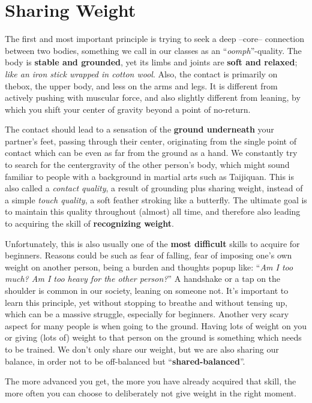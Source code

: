 \section{Sharing Weight}\label{sec:sharing-weight}

The first and most important principle is trying to seek a deep --core-- connection between two bodies, something we call in our classes as an ``\textit{oomph}''-quality.
The body is \textbf{stable and grounded}, yet its limbs and joints are \textbf{soft and relaxed}; \textit{like an iron stick wrapped in cotton wool}.
Also, the contact is primarily on \gls{thebox}, the upper body, and less on the arms and legs.
It is different from actively pushing with muscular force, and also slightly different from leaning, by which you shift your center of gravity beyond a point of no-return.

The contact should lead to a sensation of the \textbf{ground underneath} your partner's feet, passing through their center, originating from the single point of contact which can be even as far from the ground as a hand.
We constantly try to search for the \gls{centergravity} of the other person's body, which might sound familiar to people with a background in martial arts such as Taijiquan.
This is also called a \textit{contact quality}, a result of grounding plus sharing weight, instead of a simple \textit{touch quality}, a soft feather stroking like a butterfly.
The ultimate goal is to maintain this quality throughout (almost) all time, and therefore also leading to acquiring the skill of \textbf{recognizing weight}.

Unfortunately, this is also usually one of the \textbf{most difficult} skills to acquire for beginners.
Reasons could be such as fear of falling, fear of imposing one's own weight on another person, being a burden and thoughts popup like: ``\textit{Am I too much? Am I too heavy for the other person?}''
A handshake or a tap on the shoulder is common in our society, leaning on someone not.
It's important to learn this principle, yet without stopping to breathe and without tensing up, which can be a massive struggle, especially for beginners.
Another very scary aspect for many people is when going to the ground.
Having lots of weight on you or giving (lots of) weight to that person on the ground is something which needs to be trained.
We don't only share our weight, but we are also sharing our balance, in order not to be off-balanced but ``\textbf{shared-balanced}''.

The more advanced you get, the more you have already acquired that skill, the more often you can choose to deliberately not give weight in the right moment.

